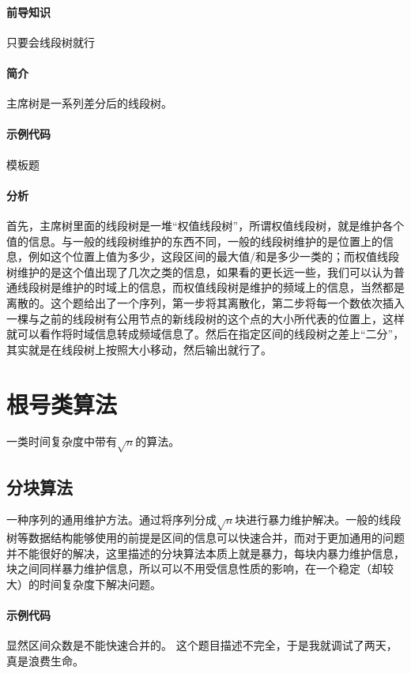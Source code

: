 \documentclass[]{cpp}
\begin{document}
\paragraph{前导知识} 只要会线段树就行
\paragraph{简介} 主席树是一系列差分后的线段树。
\paragraph{示例代码} 模板题
\paragraph{分析}
	首先，主席树里面的线段树是一堆“权值线段树”，所谓权值线段树，就是维护各个值的信息。与一般的线段树维护的东西不同，一般的线段树维护的是位置上的信息，例如这个位置上值为多少，这段区间的最大值/和是多少一类的；而权值线段树维护的是这个值出现了几次之类的信息，如果看的更长远一些，我们可以认为普通线段树是维护的时域上的信息，而权值线段树是维护的频域上的信息，当然都是离散的。这个题给出了一个序列，第一步将其离散化，第二步将每一个数依次插入一棵与之前的线段树有公用节点的新线段树的这个点的大小所代表的位置上，这样就可以看作将时域信息转成频域信息了。然后在指定区间的线段树之差上“二分”，其实就是在线段树上按照大小移动，然后输出就行了。
\section{根号类算法} 一类时间复杂度中带有$\sqrt{n}$的算法。
\subsection{分块算法} 一种序列的通用维护方法。通过将序列分成$\sqrt{n}$块进行暴力维护解决。一般的线段树等数据结构能够使用的前提是区间的信息可以快速合并，而对于更加通用的问题并不能很好的解决，这里描述的分块算法本质上就是暴力，每块内暴力维护信息，块之间同样暴力维护信息，所以可以不用受信息性质的影响，在一个稳定（却较大）的时间复杂度下解决问题。
\paragraph{示例代码} 显然区间众数是不能快速合并的。
这个题目描述不完全，于是我就调试了两天，真是浪费生命。
\end{document}
